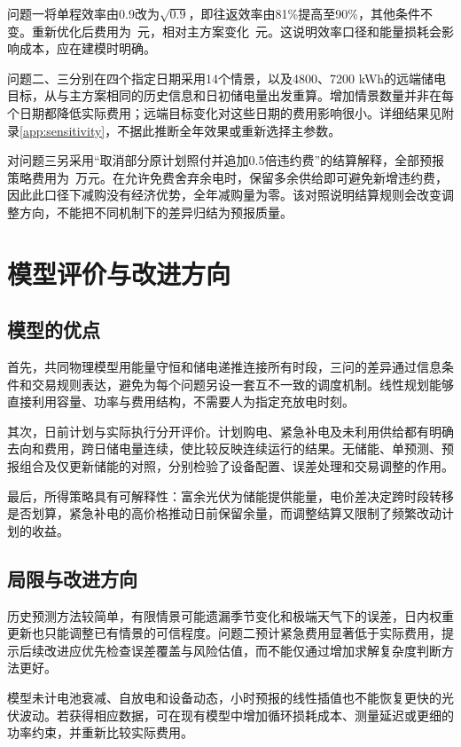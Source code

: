 问题一将单程效率由0.9改为$\sqrt{0.9}$，即往返效率由81\%提高至90\%，其他条件不变。重新优化后费用为\AltCost\ 元，相对主方案变化\AltDifference\ 元。这说明效率口径和能量损耗会影响成本，应在建模时明确。

问题二、三分别在四个指定日期采用14个情景，以及4800、7200 kWh的远端储电目标，从与主方案相同的历史信息和日初储电量出发重算。增加情景数量并非在每个日期都降低实际费用；远端目标变化对这些日期的费用影响很小。详细结果见附录\ref{app:sensitivity}，不据此推断全年效果或重新选择主参数。

对问题三另采用“取消部分原计划照付并追加0.5倍违约费”的结算解释，全部预报策略费用为\QthreeLiteralCost\ 万元。在允许免费舍弃余电时，保留多余供给即可避免新增违约费，因此此口径下减购没有经济优势，全年减购量为零。该对照说明结算规则会改变调整方向，不能把不同机制下的差异归结为预报质量。

\section{模型评价与改进方向}
\subsection{模型的优点}
首先，共同物理模型用能量守恒和储电递推连接所有时段，三问的差异通过信息条件和交易规则表达，避免为每个问题另设一套互不一致的调度机制。线性规划能够直接利用容量、功率与费用结构，不需要人为指定充放电时刻。

其次，日前计划与实际执行分开评价。计划购电、紧急补电及未利用供给都有明确去向和费用，跨日储电量连续，使比较反映连续运行的结果。无储能、单预测、预报组合及仅更新储能的对照，分别检验了设备配置、误差处理和交易调整的作用。

最后，所得策略具有可解释性：富余光伏为储能提供能量，电价差决定跨时段转移是否划算，紧急补电的高价格推动日前保留余量，而调整结算又限制了频繁改动计划的收益。

\subsection{局限与改进方向}
历史预测方法较简单，有限情景可能遗漏季节变化和极端天气下的误差，日内权重更新也只能调整已有情景的可信程度。问题二预计紧急费用显著低于实际费用，提示后续改进应优先检查误差覆盖与风险估值，而不能仅通过增加求解复杂度判断方法更好。

模型未计电池衰减、自放电和设备动态，小时预报的线性插值也不能恢复更快的光伏波动。若获得相应数据，可在现有模型中增加循环损耗成本、测量延迟或更细的功率约束，并重新比较实际费用。

